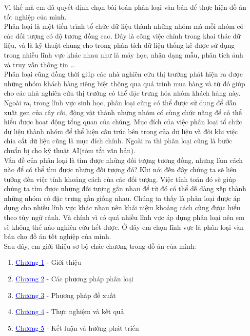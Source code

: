 \hspace*{10mm}Vì thế mà em đã quyết định chọn bài toán phân loại văn bản để thực hiện đồ án tốt nghiệp của mình.\\
\hspace*{10mm}Phân loại là một tiến trình tổ chức dữ liệu thành những nhóm mà mỗi nhóm có các đối tượng có độ tương đồng cao. Đây là công việc chính trong khai thác dữ liệu, và là kỹ thuật chung cho trong phân tích dữ liệu thống kê được sử dụng trong nhiều lĩnh vực khác nhau như là máy học, nhận dạng mẫu, phân tích ảnh và truy vấn thông tin \ldots\\
\hspace*{10mm}Phân loại cũng đồng thời giúp các nhà nghiên cứu thị trường phát hiện ra được những nhóm khách hàng riêng biệt thông qua quá trình mua hàng và từ đó giúp cho các nhà nghiên cứu thị trường có thể đặc trưng hóa nhóm khách hàng này. Ngoài ra, trong lĩnh vực sinh học, phân loại cũng có thể được sử dụng để dẫn xuất gen của cây cối, động vật thành những nhóm có cùng chức năng để có thể hiểu được hoạt động tổng quan của chúng. Mục đích của việc phân loại tổ chức dữ liệu thành nhóm để thể hiện cấu trúc bên trong của dữ liệu và đôi khi việc chia cắt dữ liệu cũng là mục đích chính. Ngoài ra thì phân loại cũng là bước chuẩn bị cho kỹ thuật AI(tóm tắt văn bản).\\
\hspace*{10mm}Vấn đề của phân loại là tìm được những đối tượng tương đồng, nhưng làm cách nào để có thể tìm được những đối tượng đó? Khi nói đến đây chúng ta sẽ liên tưởng đến việc tính khoảng cách của các đối tượng. Việc tính toán đó sẽ giúp chúng ta tìm được những đối tượng gần nhau để từ đó có thể dễ dàng xếp thành những nhóm có đặc trưng gần giống nhau. Chúng ta thấy là phân loại được áp dụng cho nhiều lĩnh vực khác nhau nên khái niệm khoảng cách cũng được hiểu theo tùy ngữ cảnh. Và chính vì có quá nhiều lĩnh vực áp dụng phân loại nên em sẽ không thể nào nghiên cứu hết được. Ở đây em chọn lĩnh vực là phân loại văn bản cho đồ án tốt nghiệp của mình.\\
\hspace*{10mm}Sau đây, em giới thiệu sơ bộ chác chương trong đồ án của mình: \\
\begin{enumerate}
\vspace{-10mm}
\addtolength{\itemindent}{5mm}
\item[] \hyperref[Chapter1]{\textcolor{blue}{Chương 1}} - Giới thiệu
\item[] \hyperref[Chapter2]{\textcolor{blue}{Chương 2}} - Các phương pháp phân loại
\item[] \hyperref[Chapter3]{\textcolor{blue}{Chương 3}} - Phương pháp đề xuất
\item[] \hyperref[Chapter4]{\textcolor{blue}{Chương 4}} - Thực nghiệm và kết quả
\item[] \hyperref[Chapter5]{\textcolor{blue}{Chương 5}} - Kết luận và hướng phát triển
\end{enumerate}


